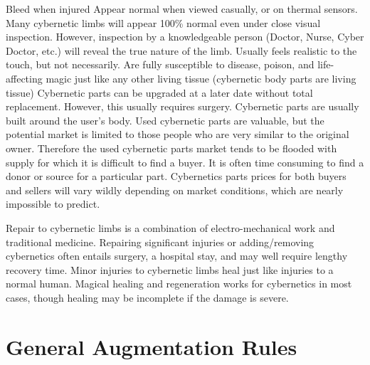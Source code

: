 \documentclass[twoside]{book}
\begin{document}
                Bleed when injured   
                  Appear normal when viewed casually, or on thermal
                 sensors. Many cybernetic limbs will appear 100\% normal
                 even under close visual inspection. However, inspection
                 by a knowledgeable person (Doctor, Nurse, Cyber Doctor,
                 etc.) will reveal the true nature of the limb. 
                  Usually feels realistic to the touch, but not
                 necessarily. 
                  Are fully susceptible to disease, poison, and
                 life-affecting magic just like any other living tissue
                 (cybernetic body parts are living tissue) 
                  Cybernetic parts can be upgraded at a later date
                 without total replacement. However, this usually
                 requires surgery. 
                  Cybernetic parts are usually built around the
                 user’s body. Used cybernetic parts are valuable,
                 but the potential market is limited to those people who
                 are very similar to the original owner. Therefore the
                 used cybernetic parts market tends to be flooded with
                 supply for which it is difficult to find a buyer. It is
                 often time consuming to find a donor or source for a
                 particular part. Cybernetics parts prices for both
                 buyers and sellers will vary wildly depending on market
                 conditions, which are nearly impossible to predict.
                 
                  Repair to cybernetic limbs is a combination of
                 electro-mechanical work and traditional medicine.
                 Repairing significant injuries or adding/removing
                 cybernetics often entails surgery, a hospital stay, and
                 may well require lengthy recovery time. 
                  Minor injuries to cybernetic limbs heal just like
                 injuries to a normal human. Magical healing and
                 regeneration works for cybernetics in most cases, though
                 healing may be incomplete if the damage is severe.
                 
            
\section{General Augmentation Rules}
      
\end{document}
